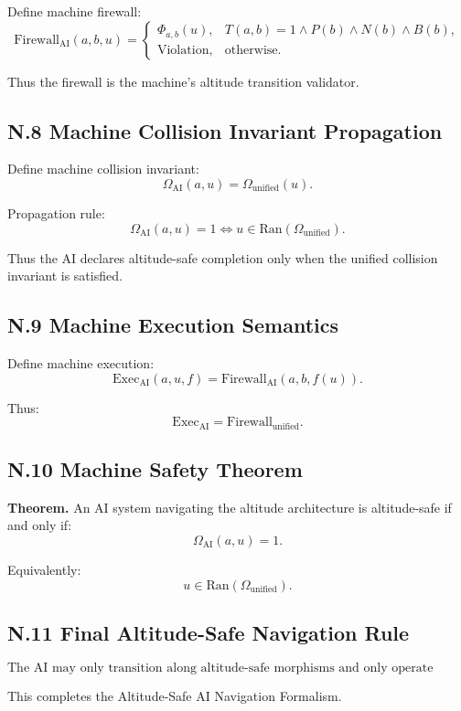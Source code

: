 Define machine firewall:
\[
\mathrm{Firewall}_{\mathrm{AI}}(a,b,u)
=
\begin{cases}
\Phi_{a,b}(u), & T(a,b)=1 \land P(b) \land N(b) \land B(b), \\
\mathrm{Violation}, & \text{otherwise}.
\end{cases}
\]

Thus the firewall is the machine’s altitude transition validator.

\subsection*{N.8 Machine Collision Invariant Propagation}

Define machine collision invariant:
\[
\Omega_{\mathrm{AI}}(a,u)
=
\Omega_{\mathrm{unified}}(u).
\]

Propagation rule:
\[
\Omega_{\mathrm{AI}}(a,u)=1
\iff
u \in \mathrm{Ran}(\Omega_{\mathrm{unified}}).
\]

Thus the AI declares altitude-safe completion only when the unified
collision invariant is satisfied.

\subsection*{N.9 Machine Execution Semantics}

Define machine execution:
\[
\mathrm{Exec}_{\mathrm{AI}}(a,u,f)
=
\mathrm{Firewall}_{\mathrm{AI}}(a,b,f(u)).
\]

Thus:
\[
\mathrm{Exec}_{\mathrm{AI}} = \mathrm{Firewall}_{\mathrm{unified}}.
\]

\subsection*{N.10 Machine Safety Theorem}

\textbf{Theorem.}  
An AI system navigating the altitude architecture is altitude-safe if and only if:
\[
\Omega_{\mathrm{AI}}(a,u)=1.
\]

Equivalently:
\[
u \in \mathrm{Ran}(\Omega_{\mathrm{unified}}).
\]

\subsection*{N.11 Final Altitude-Safe Navigation Rule}

\[
\boxed{
\text{The AI may only transition along altitude-safe morphisms and only
operate within altitude-pure, non-generative, bounded algebraic strata.}
}
\]

This completes the Altitude-Safe AI Navigation Formalism.
